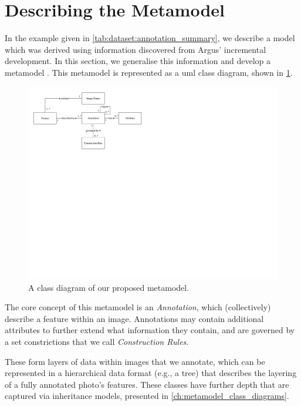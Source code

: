\section{Describing the Metamodel}
\label{sec:dataset:architecture:metamodel}


In the example given in \cref{tab:dataset:annotation_summary}, we describe a model which was derived using information discovered from Argus' incremental development. In this section, we generalise this information and develop a metamodel . This metamodel is represented as a \gls{uml} class diagram, shown in \cref{fig:dataset:metamodel_class_diagram}.

\begin{figure}[h]
  \centering
  \includegraphics[width=\textwidth]{images/dataset/metamodel_class_diagram}
  \caption[Class diagram of our proposed metamodel]{A class diagram of our proposed metamodel.}
  \label{fig:dataset:metamodel_class_diagram}
\end{figure}

The core concept of this metamodel is an \textit{Annotation}, which (collectively) describe a feature within an image. Annotations may contain additional attributes to further extend what information they contain, and are governed by a set constrictions that we call \textit{Construction Rules}.

These form layers of data within images that we annotate, which can be represented in a hierarchical data format (e.g., a tree) that describes the layering of a fully annotated photo's features. These classes have further depth that are captured via inheritance models, presented in \cref{ch:metamodel_class_diagrams}.

